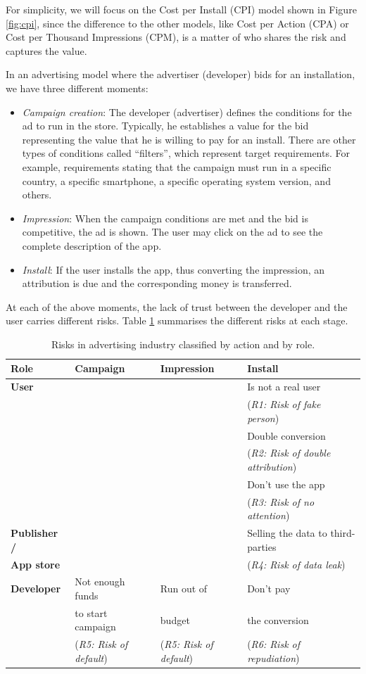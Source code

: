 For simplicity, we will focus on the Cost per Install (CPI) model shown in Figure \ref{fig:cpi}, since the difference to the other models, like Cost per Action (CPA) or Cost per Thousand Impressions (CPM), is a matter of who shares the risk and captures the value.

In an advertising model where the advertiser (developer) bids for an installation, we have three different moments:

\begin{itemize}
\item {\em Campaign creation}: The developer (advertiser) defines the conditions for the ad to run in the store. Typically, he establishes a value for the bid representing the value that he is willing to pay for an install. There are other types of conditions called ``filters'', which represent target requirements. For example, requirements stating that the campaign must run in a specific country, a specific smartphone, a specific operating system version, and others.
\item {\em Impression}: When the campaign conditions are met and the bid is competitive, the ad is shown. The user may click on the ad to see the complete description of the app.
\item {\em Install}: If the user installs the app, thus converting the impression, an attribution is due and the corresponding money is transferred.
\end{itemize}


At each of the above moments, the lack of trust between the developer and the user carries different risks. Table \ref{tab:risks} summarises the different risks at each stage.


\begin{table}[ht]
\centering
\begin{tabular}{|l||l|l|l|} \hline
{\bf Role} & {\bf Campaign} & {\bf Impression}  & {\bf Install} \\ \hline
{\bf User} & & & Is not a real user \\ 
 & & & ({\em R1: Risk of fake person}) \\ 
 & & & Double conversion  \\
 & & & ({\em R2: Risk of double attribution}) \\
 & & & Don't use the app  \\
 & & & ({\em R3: Risk of no attention}) \\  \hline
{\bf Publisher  /}  & & & Selling the data to third-parties \\ 
{\bf App store} & & & ({\em R4: Risk of data leak})\\ \hline
{\bf Developer} & Not enough funds & Run out of & Don't pay \\  
 & to start campaign & budget & the conversion \\  
  & ({\em R5: Risk of default}) & ({\em R5: Risk of default}) & ({\em R6: Risk of repudiation}) \\  
\hline\end{tabular}
\caption{Risks in advertising industry classified by action and by role.}
\label{tab:risks}
\end{table}

